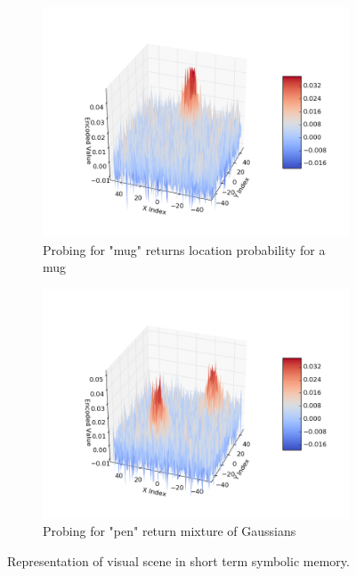 \documentclass[conference]{IEEEtran}
\begin{document}
\begin{figure}[th!]
			\begin{subfigure}{0.45\columnwidth}
				\center
				\includegraphics[width=\linewidth]{img/probe_for_mug.png}
				\caption{Probing for "mug" returns location probability for a mug}
				\label{fig:probing-single}
			\end{subfigure}
			\begin{subfigure}{0.45\columnwidth}
				\center
				\includegraphics[width=\linewidth]{img/probe_for_pen.png}
				\caption{Probing for "pen" return mixture of Gaussians}
				\label{fig:probing-double}
			\end{subfigure}
						
		
		\caption{Representation of visual scene in short term symbolic memory. }
		
	\end{figure}
	
\end{document}
